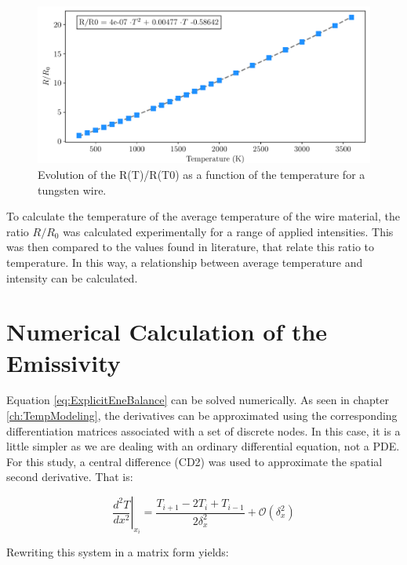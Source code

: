 \begin{figure}[h]
    \centering
    \includegraphics[width=0.85\columnwidth]{Figure_LiteratureResTemp/RR0Tungsten.pdf}
    \caption{Evolution of the R(T)/R(T0) as a function of the temperature for a tungsten wire.}
    \label{fig:RR0TungstenLit}
\end{figure}

To calculate the temperature of the average temperature of the wire material, the ratio $R/R_{0}$ was calculated experimentally for a range of applied intensities.  This was then compared to the values found in literature, that relate this ratio to temperature. In this way, a relationship between average temperature and intensity can be calculated. 

\section{Numerical Calculation of the Emissivity}
\label{sec:EmissCalc}

Equation \ref{eq:ExplicitEneBalance} can be solved numerically. As seen in chapter \ref{ch:TempModeling}, the derivatives can be approximated using the corresponding differentiation matrices associated with a set of discrete nodes. In this case, it is a little simpler as we are dealing with an ordinary differential equation, not a PDE. For this study, a central difference (CD2) was used to approximate the spatial second derivative. That is: 

\begin{equation}
    \left. \frac{d^2 T}{dx^2}\right|_{x_i} = \frac{T_{i+1}-2T_i + T_{i-1}}{2\delta_x^2} + \mathcal{O}(\delta_x^2)
\end{equation}

Rewriting this system in a matrix form yields: 

